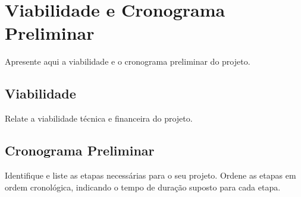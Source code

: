 \chapter{Viabilidade e Cronograma Preliminar}\label{cap:viabilidade}

Apresente aqui a viabilidade e o cronograma preliminar do projeto.

\section{Viabilidade}\label{s:viabilidade}

Relate a viabilidade técnica e financeira do projeto.

\section{Cronograma Preliminar}\label{s:cronograma}

Identifique e liste as etapas necessárias para o seu projeto.
Ordene as etapas em ordem cronológica, indicando o tempo de duração suposto para cada etapa.
